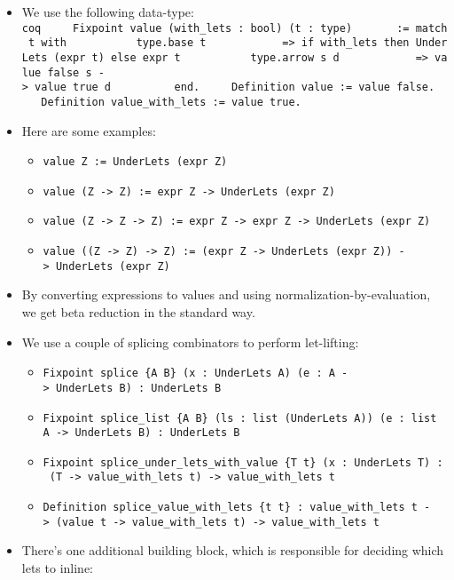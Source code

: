 \begin{itemize}
\item
  We use the following data-type:
  \texttt{coq\ \ \ \ \ Fixpoint\ value\textquotesingle{}\ (with\_lets\ :\ bool)\ (t\ :\ type)\ \ \ \ \ ~\ :=\ match\ t\ with\ \ \ \ \ ~\ ~\ ~\textbar{}\ type.base\ t\ \ \ \ \ ~\ ~\ ~\ ~=\textgreater{}\ if\ with\_lets\ then\ UnderLets\ (expr\ t)\ else\ expr\ t\ \ \ \ \ ~\ ~\ ~\textbar{}\ type.arrow\ s\ d\ \ \ \ \ ~\ ~\ ~\ ~=\textgreater{}\ value\textquotesingle{}\ false\ s\ -\textgreater{}\ value\textquotesingle{}\ true\ d\ \ \ \ \ ~\ ~\ ~end.\ \ \ \ \ Definition\ value\ :=\ value\textquotesingle{}\ false.\ \ \ \ \ Definition\ value\_with\_lets\ :=\ value\textquotesingle{}\ true.}
\item
  Here are some examples:

  \begin{itemize}
  \tightlist
  \item
    \texttt{value\ Z\ :=\ UnderLets\ (expr\ Z)}
  \item
    \texttt{value\ (Z\ -\textgreater{}\ Z)\ :=\ expr\ Z\ -\textgreater{}\ UnderLets\ (expr\ Z)}
  \item
    \texttt{value\ (Z\ -\textgreater{}\ Z\ -\textgreater{}\ Z)\ :=\ expr\ Z\ -\textgreater{}\ expr\ Z\ -\textgreater{}\ UnderLets\ (expr\ Z)}
  \item
    \texttt{value\ ((Z\ -\textgreater{}\ Z)\ -\textgreater{}\ Z)\ :=\ (expr\ Z\ -\textgreater{}\ UnderLets\ (expr\ Z))\ -\textgreater{}\ UnderLets\ (expr\ Z)}
  \end{itemize}
\item
  By converting expressions to values and using
  normalization-by-evaluation, we get beta reduction in the standard
  way.
\item
  We use a couple of splicing combinators to perform let-lifting:

  \begin{itemize}
  \tightlist
  \item
    \texttt{Fixpoint\ splice\ \{A\ B\}\ (x\ :\ UnderLets\ A)\ (e\ :\ A\ -\textgreater{}\ UnderLets\ B)\ :\ UnderLets\ B}
  \item
    \texttt{Fixpoint\ splice\_list\ \{A\ B\}\ (ls\ :\ list\ (UnderLets\ A))\ (e\ :\ list\ A\ -\textgreater{}\ UnderLets\ B)\ :\ UnderLets\ B}
  \item
    \texttt{Fixpoint\ splice\_under\_lets\_with\_value\ \{T\ t\}\ (x\ :\ UnderLets\ T)\ :\ (T\ -\textgreater{}\ value\_with\_lets\ t)\ -\textgreater{}\ value\_with\_lets\ t}
  \item
    \texttt{Definition\ splice\_value\_with\_lets\ \{t\ t\textquotesingle{}\}\ :\ value\_with\_lets\ t\ -\textgreater{}\ (value\ t\ -\textgreater{}\ value\_with\_lets\ t\textquotesingle{})\ -\textgreater{}\ value\_with\_lets\ t\textquotesingle{}}
  \end{itemize}
\item
  There's one additional building block, which is responsible for
  deciding which lets to inline:


\end{itemize}

